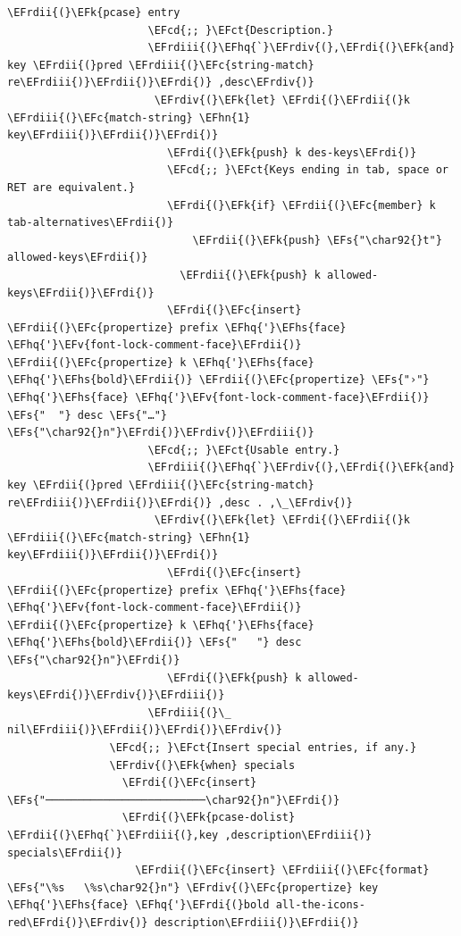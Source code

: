 \documentclass{scrartcl}
\newcommand{\EFk}[1]{\textcolor{EFk}{#1}} %
\newcommand{\EFs}[1]{\textcolor{EFs}{#1}} %
\newcommand{\EFct}[1]{\textcolor{EFct}{#1}} %
\newcommand{\EFc}[1]{\textcolor{EFc}{#1}} %
\newcommand{\EFv}[1]{\textcolor{EFv}{#1}} %
\newcommand{\EFcd}[1]{\textcolor{EFcd}{#1}} %
\newcommand{\EFhn}[1]{#1} %
\newcommand{\EFhq}[1]{#1} %
\newcommand{\EFhs}[1]{#1} %
\newcommand{\EFrdi}[1]{#1} %
\newcommand{\EFrdii}[1]{#1} %
\newcommand{\EFrdiii}[1]{#1} %
\newcommand{\EFrdiv}[1]{#1} %
\begin{document}
\begin{Code}
\begin{Verbatim}[]
                    \EFrdii{(}\EFk{pcase} entry
                      \EFcd{;; }\EFct{Description.}
                      \EFrdiii{(}\EFhq{`}\EFrdiv{(},\EFrdi{(}\EFk{and} key \EFrdii{(}pred \EFrdiii{(}\EFc{string-match} re\EFrdiii{)}\EFrdii{)}\EFrdi{)} ,desc\EFrdiv{)}
                       \EFrdiv{(}\EFk{let} \EFrdi{(}\EFrdii{(}k \EFrdiii{(}\EFc{match-string} \EFhn{1} key\EFrdiii{)}\EFrdii{)}\EFrdi{)}
                         \EFrdi{(}\EFk{push} k des-keys\EFrdi{)}
                         \EFcd{;; }\EFct{Keys ending in tab, space or RET are equivalent.}
                         \EFrdi{(}\EFk{if} \EFrdii{(}\EFc{member} k tab-alternatives\EFrdii{)}
                             \EFrdii{(}\EFk{push} \EFs{"\char92{}t"} allowed-keys\EFrdii{)}
                           \EFrdii{(}\EFk{push} k allowed-keys\EFrdii{)}\EFrdi{)}
                         \EFrdi{(}\EFc{insert} \EFrdii{(}\EFc{propertize} prefix \EFhq{'}\EFhs{face} \EFhq{'}\EFv{font-lock-comment-face}\EFrdii{)} \EFrdii{(}\EFc{propertize} k \EFhq{'}\EFhs{face} \EFhq{'}\EFhs{bold}\EFrdii{)} \EFrdii{(}\EFc{propertize} \EFs{"›"} \EFhq{'}\EFhs{face} \EFhq{'}\EFv{font-lock-comment-face}\EFrdii{)} \EFs{"  "} desc \EFs{"…"} \EFs{"\char92{}n"}\EFrdi{)}\EFrdiv{)}\EFrdiii{)}
                      \EFcd{;; }\EFct{Usable entry.}
                      \EFrdiii{(}\EFhq{`}\EFrdiv{(},\EFrdi{(}\EFk{and} key \EFrdii{(}pred \EFrdiii{(}\EFc{string-match} re\EFrdiii{)}\EFrdii{)}\EFrdi{)} ,desc . ,\_\EFrdiv{)}
                       \EFrdiv{(}\EFk{let} \EFrdi{(}\EFrdii{(}k \EFrdiii{(}\EFc{match-string} \EFhn{1} key\EFrdiii{)}\EFrdii{)}\EFrdi{)}
                         \EFrdi{(}\EFc{insert} \EFrdii{(}\EFc{propertize} prefix \EFhq{'}\EFhs{face} \EFhq{'}\EFv{font-lock-comment-face}\EFrdii{)} \EFrdii{(}\EFc{propertize} k \EFhq{'}\EFhs{face} \EFhq{'}\EFhs{bold}\EFrdii{)} \EFs{"   "} desc \EFs{"\char92{}n"}\EFrdi{)}
                         \EFrdi{(}\EFk{push} k allowed-keys\EFrdi{)}\EFrdiv{)}\EFrdiii{)}
                      \EFrdiii{(}\_ nil\EFrdiii{)}\EFrdii{)}\EFrdi{)}\EFrdiv{)}
                \EFcd{;; }\EFct{Insert special entries, if any.}
                \EFrdiv{(}\EFk{when} specials
                  \EFrdi{(}\EFc{insert} \EFs{"─────────────────────────\char92{}n"}\EFrdi{)}
                  \EFrdi{(}\EFk{pcase-dolist} \EFrdii{(}\EFhq{`}\EFrdiii{(},key ,description\EFrdiii{)} specials\EFrdii{)}
                    \EFrdii{(}\EFc{insert} \EFrdiii{(}\EFc{format} \EFs{"\%s   \%s\char92{}n"} \EFrdiv{(}\EFc{propertize} key \EFhq{'}\EFhs{face} \EFhq{'}\EFrdi{(}bold all-the-icons-red\EFrdi{)}\EFrdiv{)} description\EFrdiii{)}\EFrdii{)}

\end{Verbatim}
\end{Code}
\end{document}
